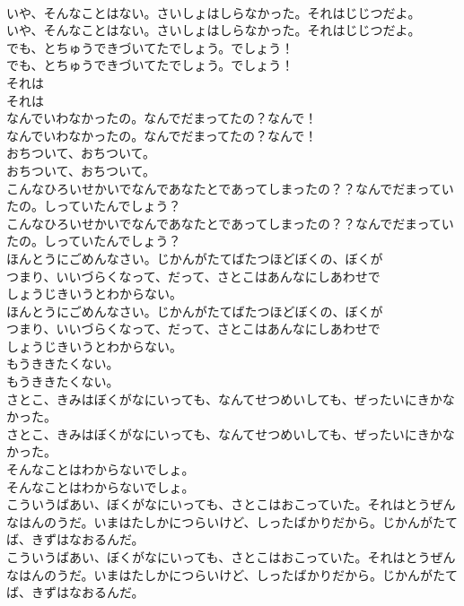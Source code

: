\documentclass[8pt]{extreport}
\begin{document}
\begin{CJK}{UTF8}{min}
\\	いや、そんなことはない。さいしょはしらなかった。それはじじつだよ。	
\\	いや、そんなことはない。さいしょはしらなかった。それはじじつだよ。 
\\	でも、とちゅうできづいてたでしょう。でしょう！	
\\	でも、とちゅうできづいてたでしょう。でしょう！ 
\\	それは
\\	それは
\\	なんでいわなかったの。なんでだまってたの？なんで！	
\\	なんでいわなかったの。なんでだまってたの？なんで！ 
\\	おちついて、おちついて。	
\\	おちついて、おちついて。 
\\	こんなひろいせかいでなんであなたとであってしまったの？？なんでだまっていたの。しっていたんでしょう？	
\\	こんなひろいせかいでなんであなたとであってしまったの？？なんでだまっていたの。しっていたんでしょう？ 
\\	ほんとうにごめんなさい。じかんがたてばたつほどぼくの、ぼくが
\\	つまり、いいづらくなって、だって、さとこはあんなにしあわせで
\\	しょうじきいうとわからない。	
\\	ほんとうにごめんなさい。じかんがたてばたつほどぼくの、ぼくが
\\	つまり、いいづらくなって、だって、さとこはあんなにしあわせで
\\	しょうじきいうとわからない。 
\\	もうききたくない。	
\\	もうききたくない。 
\\	さとこ、きみはぼくがなにいっても、なんてせつめいしても、ぜったいにきかなかった。	
\\	さとこ、きみはぼくがなにいっても、なんてせつめいしても、ぜったいにきかなかった。 
\\	そんなことはわからないでしょ。	
\\	そんなことはわからないでしょ。 
\\	こういうばあい、ぼくがなにいっても、さとこはおこっていた。それはとうぜんなはんのうだ。いまはたしかにつらいけど、しったばかりだから。じかんがたてば、きずはなおるんだ。	
\\	こういうばあい、ぼくがなにいっても、さとこはおこっていた。それはとうぜんなはんのうだ。いまはたしかにつらいけど、しったばかりだから。じかんがたてば、きずはなおるんだ。 

\end{CJK}
\end{document}
